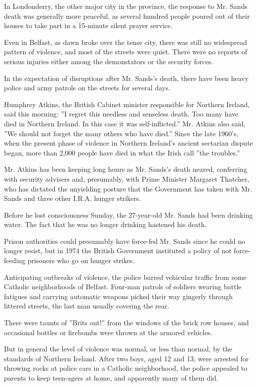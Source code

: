 In Londonderry, the other major city in the province, the response to
Mr. Sands death was generally more peaceful, as several hundred people
poured out of their houses to take part in a 15-minute silent prayer
service.

Even in Belfast, as dawn broke over the tense city, there was still no
widespread pattern of violence, and most of the streets were quiet.
There were no reports of serious injuries either among the demonstators
or the security forces.

In the expectation of disruptions after Mr. Sands's death, there have
been heavy police and army patrols on the streets for several days.

Humphrey Atkins, the British Cabinet minister responsible for Northern
Ireland, said this morning: ''I regret this needless and senseless
death. Too many have died in Northern Ireland. In this case it was
self-inflicted.'' Mr. Atkins also said, ''We should not forget the many
others who have died.'' Since the late 1960's, when the present phase of
violence in Northern Ireland's ancient sectarian dispute began, more
than 2,000 people have died in what the Irish call ''the troubles.''

Mr. Atkins has been keeping long hours as Mr. Sands's death neared,
conferring with security advisers and, presumably, with Prime Minister
Margaret Thatcher, who has dictated the unyielding posture that the
Government has taken with Mr. Sands and three other I.R.A. hunger
strikers.

Before he lost consciousness Sunday, the 27-year-old Mr. Sands had been
drinking water. The fact that he was no longer drinking hastened his
death.

Prison authorities could presumably have force-fed Mr. Sands since he
could no longer resist, but in 1974 the British Government instituted a
policy of not force-feeding prisoners who go on hunger strikes.

Anticipating outbreaks of violence, the police barred vehicular traffic
from some Catholic neighborhoods of Belfast. Four-man patrols of
soldiers wearing battle fatigues and carrying automatic weapons picked
their way gingerly through littered streets, the last man usually
covering the rear.

There were taunts of ''Brits out!'' from the windows of the brick row
houses, and occasional bottles or firebombs were thrown at the armored
vehicles.

But in general the level of violence was normal, or less than normal, by
the standards of Northern Ireland. After two boys, aged 12 and 13, were
arrested for throwing rocks at police cars in a Catholic neighborhood,
the police appealed to parents to keep teen-agers at home, and
apparently many of them did.

